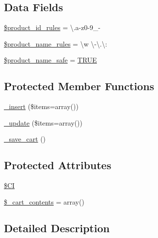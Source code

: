 \subsection*{Data Fields}
\begin{DoxyCompactItemize}
\item 
\mbox{\hyperlink{class_c_i___cart_aef9fb0bb2a9ab37008d77ed80b7b122b}{\$product\+\_\+id\+\_\+rules}} = \textquotesingle{}\textbackslash{}.a-\/z0-\/9\+\_\+-\/\textquotesingle{}
\item 
\mbox{\hyperlink{class_c_i___cart_afdc2e791be5e676e94580a0d9ed63ebf}{\$product\+\_\+name\+\_\+rules}} = \textquotesingle{}\textbackslash{}w \textbackslash{}-\/\textbackslash{}.\textbackslash{}\+:\textquotesingle{}
\item 
\mbox{\hyperlink{class_c_i___cart_afefced563284b97869b3d35053857362}{\$product\+\_\+name\+\_\+safe}} = \mbox{\hyperlink{constants_8php_ae04a3efe6aa42044f803ee90c2277846}{T\+R\+UE}}
\end{DoxyCompactItemize}
\subsection*{Protected Member Functions}
\begin{DoxyCompactItemize}
\item 
\mbox{\hyperlink{class_c_i___cart_a55d27979573b7d46bdf774f247c15b07}{\+\_\+insert}} (\$items=array())
\item 
\mbox{\hyperlink{class_c_i___cart_ac7b19afff2357d4b9e926ee2df1f3e65}{\+\_\+update}} (\$items=array())
\item 
\mbox{\hyperlink{class_c_i___cart_abaa559f3e9e7f8ad933f19165fb61083}{\+\_\+save\+\_\+cart}} ()
\end{DoxyCompactItemize}
\subsection*{Protected Attributes}
\begin{DoxyCompactItemize}
\item 
\mbox{\hyperlink{class_c_i___cart_ae0314d046ddf7fcfaec03222977427d3}{\$\+CI}}
\item 
\mbox{\hyperlink{class_c_i___cart_a93aff4174af6004d8cc7a51bf0c59632}{\$\+\_\+cart\+\_\+contents}} = array()
\end{DoxyCompactItemize}


\subsection{Detailed Description}


